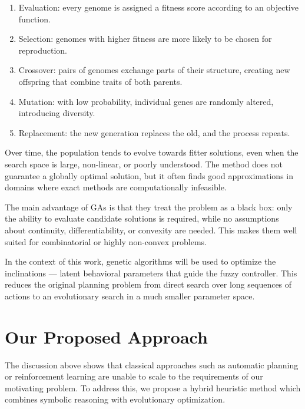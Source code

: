 \documentclass[12pt, a4paper]{report}
\begin{document}
		\begin{enumerate}
			\item Evaluation: every genome is assigned a fitness score according to an objective function.
		
		\item Selection: genomes with higher fitness are more likely to be chosen for reproduction.
		
		\item Crossover: pairs of genomes exchange parts of their structure, creating new offspring that combine traits of both parents.
		
		\item Mutation: with low probability, individual genes are randomly altered, introducing diversity.
		
		\item Replacement: the new generation replaces the old, and the process repeats.
		\end{enumerate}
		
		Over time, the population tends to evolve towards fitter solutions, even when the search space is large, non-linear, or poorly understood. The method does not guarantee a globally optimal solution, but it often finds good approximations in domains where exact methods are computationally infeasible.
		
		The main advantage of GAs is that they treat the problem as a black box: only the ability to evaluate candidate solutions is required, while no assumptions about continuity, differentiability, or convexity are needed. This makes them well suited for combinatorial or highly non-convex problems.
		
		In the context of this work, genetic algorithms will be used to optimize the inclinations — latent behavioral parameters that guide the fuzzy controller. This reduces the original planning problem from direct search over long sequences of actions to an evolutionary search in a much smaller parameter space.
	
	\section{Our Proposed Approach}
	
	The discussion above shows that classical approaches such as automatic planning or reinforcement learning are unable to scale to the requirements of our motivating problem. To address this, we propose a hybrid heuristic method which combines symbolic reasoning with evolutionary optimization.
	
\end{document}

